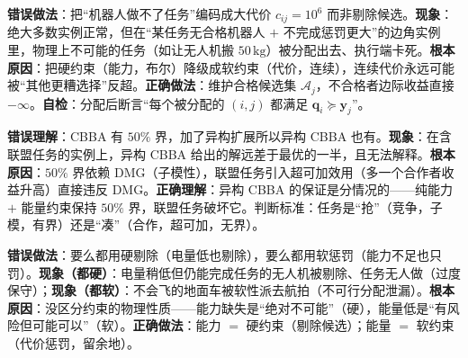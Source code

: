 \begin{pitfall}
\textbf{错误做法}：把“机器人做不了任务”编码成大代价 $c_{ij}=10^6$ 而非剔除候选。\textbf{现象}：绝大多数实例正常，但在“某任务无合格机器人 $+$ 不完成惩罚更大”的边角实例里，物理上不可能的任务（如让无人机搬 $50\,\mathrm{kg}$）被分配出去、执行端卡死。\textbf{根本原因}：把硬约束（能力，布尔）降级成软约束（代价，连续），连续代价永远可能被“其他更糟选择”反超。\textbf{正确做法}：维护合格候选集 $\mathcal{A}_j$，不合格者边际收益直接 $-\infty$。\textbf{自检}：分配后断言“每个被分配的 $(i,j)$ 都满足 $\mathbf{q}_i\succeq\mathbf{y}_j$”。
\end{pitfall}

\begin{pitfall}
\textbf{错误理解}：CBBA 有 $50\%$ 界，加了异构扩展所以异构 CBBA 也有。\textbf{现象}：在含联盟任务的实例上，异构 CBBA 给出的解远差于最优的一半，且无法解释。\textbf{根本原因}：$50\%$ 界依赖 DMG（子模性），联盟任务引入超可加效用（多一个合作者收益升高）直接违反 DMG。\textbf{正确理解}：异构 CBBA 的保证是分情况的——纯能力 $+$ 能量约束保持 $50\%$ 界，联盟任务破坏它。判断标准：任务是“抢”（竞争，子模，有界）还是“凑”（合作，超可加，无界）。
\end{pitfall}

\begin{pitfall}
\textbf{错误做法}：要么都用硬剔除（电量低也剔除），要么都用软惩罚（能力不足也只罚）。\textbf{现象（都硬）}：电量稍低但仍能完成任务的无人机被剔除、任务无人做（过度保守）；\textbf{现象（都软）}：不会飞的地面车被软性派去航拍（不可行分配泄漏）。\textbf{根本原因}：没区分约束的物理性质——能力缺失是“绝对不可能”（硬），能量低是“有风险但可能可以”（软）。\textbf{正确做法}：能力 $=$ 硬约束（剔除候选）；能量 $=$ 软约束（代价惩罚，留余地）。
\end{pitfall}

